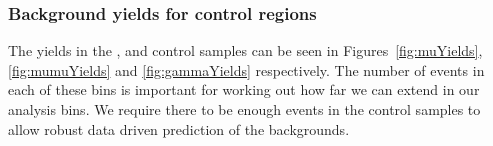 \subsubsection{Background yields for control regions}

The yields in the \mj, \mmj and \gj control samples can be seen in
Figures~\ref{fig:muYields}, \ref{fig:mumuYields} and \ref{fig:gammaYields}
respectively. The number of events in each of these bins is important for
working out how far we can extend in our analysis bins. We require there to be
enough events in the control samples to allow robust data driven prediction of
the backgrounds.

\begin{figure}[h!]
  \centering
  ~~
  \\
\end{figure}
